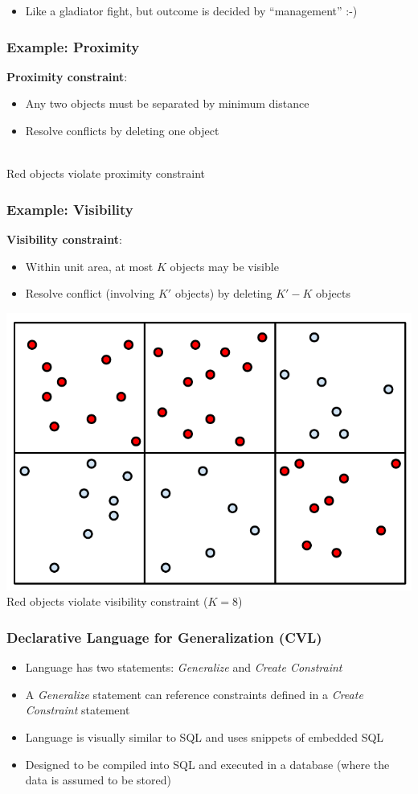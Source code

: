 \documentclass{beamer}
\begin{document}
{  \begin{center}
  	  
  \end{center}
  
    \begin{itemize}
  \item Like a gladiator fight, but outcome is decided by ``management'' :-)
  \end{itemize}

}

\frame
{
  \frametitle{Example: Proximity}
  \textbf{Proximity constraint}:
  \begin{itemize}
  \item Any two objects must be separated by minimum distance
  \item Resolve conflicts by deleting one object
  \end{itemize}
  \begin{center}
   \\
  \small{Red objects violate proximity constraint}
  \end{center}
}

\frame
{
  \frametitle{Example: Visibility}
  \textbf{Visibility constraint}:  
  \begin{itemize}
  \item Within unit area, at most $K$ objects may be visible
  \item Resolve conflict (involving $K'$ objects) by deleting $K' - K$ objects
  \end{itemize}
  \begin{center}
  \includegraphics[scale=0.4]{figs/cvl-visibility.pdf} \\
  \small{Red objects violate visibility constraint ($K=8$)}
  \end{center}
}

\begin{frame}[fragile]
\frametitle{Declarative Language for Generalization (CVL)}

\begin{itemize}
\item Language has two statements: \emph{Generalize} and \emph{Create Constraint}
\item A \emph{Generalize} statement can reference constraints defined in a \emph{Create Constraint} statement
\item Language is visually similar to SQL and uses snippets of embedded SQL
\item Designed to be compiled into SQL and executed in a database (where the data is assumed to be stored)
\end{itemize}
\end{frame}


\begin{frame}[fragile]
\frametitle{CVL: Generalize statement}
\begin{lstli
\end{frame}
\end{document}
